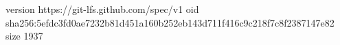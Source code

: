 version https://git-lfs.github.com/spec/v1
oid sha256:5efdc3fd0ae7232b81d451a160b252eb143d711f416c9c218f7c8f2387147e82
size 1937
